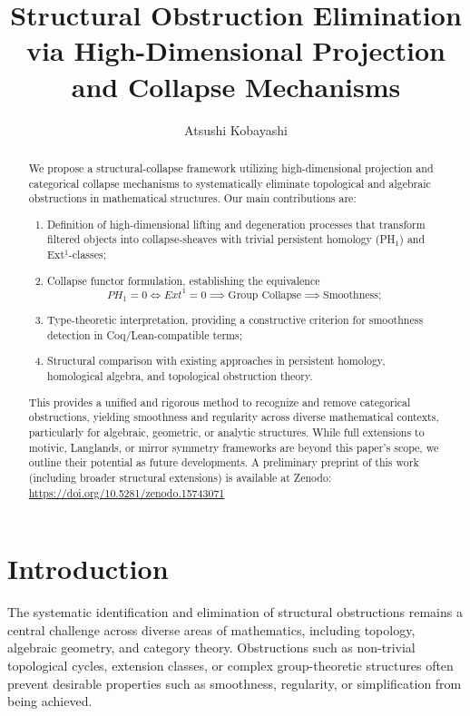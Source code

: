 \documentclass[11pt]{article}
\title{Structural Obstruction Elimination via High-Dimensional Projection and Collapse Mechanisms}
\author{Atsushi Kobayashi}
\date{}
\begin{document}
\maketitle


\begin{abstract}
We propose a structural-collapse framework utilizing high-dimensional projection and categorical collapse mechanisms to systematically eliminate topological and algebraic obstructions in mathematical structures. Our main contributions are: 
\begin{enumerate}
    \item Definition of high-dimensional lifting and degeneration processes that transform filtered objects into collapse-sheaves with trivial persistent homology (PH$_1$) and Ext$^1$-classes;
    \item Collapse functor formulation, establishing the equivalence 
    \[
    PH_1 = 0 \iff Ext^1 = 0 \implies \text{Group Collapse} \implies \text{Smoothness};
    \]
    \item Type-theoretic interpretation, providing a constructive criterion for smoothness detection in Coq/Lean-compatible terms;
    \item Structural comparison with existing approaches in persistent homology, homological algebra, and topological obstruction theory.
\end{enumerate}
This provides a unified and rigorous method to recognize and remove categorical obstructions, yielding smoothness and regularity across diverse mathematical contexts, particularly for algebraic, geometric, or analytic structures. While full extensions to motivic, Langlands, or mirror symmetry frameworks are beyond this paper's scope, we outline their potential as future developments. A preliminary preprint of this work (including broader structural extensions) is available at Zenodo: \url{https://doi.org/10.5281/zenodo.15743071}
\end{abstract}


\section{Introduction}

The systematic identification and elimination of structural obstructions remains a central challenge across diverse areas of mathematics, including topology, algebraic geometry, and category theory. Obstructions such as non-trivial topological cycles, extension classes, or complex group-theoretic structures often prevent desirable properties such as smoothness, regularity, or simplification from being achieved.
\end{document}
